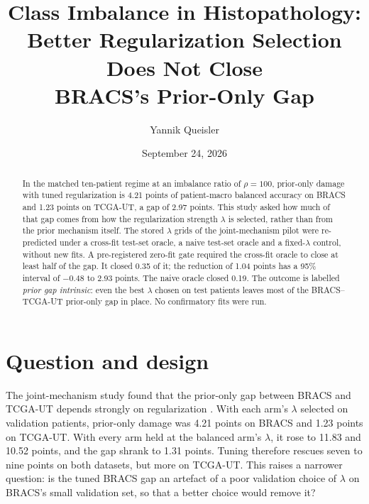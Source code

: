 \documentclass[11pt]{article}
\title{Class Imbalance in Histopathology:\\Better Regularization Selection Does Not Close\\{BRACS}'s Prior-Only Gap}
\author{Yannik Queisler}
\date{September 24, 2026}
\begin{document}
\raggedbottom
{}
\setlength{\emergencystretch}{2em}
\maketitle
\begin{abstract}
\noindent In the matched ten-patient regime at an imbalance ratio of $\rho=100$, prior-only damage with tuned regularization is 4.21 points of patient-macro balanced accuracy on BRACS and 1.23 points on TCGA-UT, a gap of 2.97 points. This study asked how much of that gap comes from how the regularization strength $\lambda$ is selected, rather than from the prior mechanism itself. The stored $\lambda$ grids of the joint-mechanism pilot were re-predicted under a cross-fit test-set oracle, a naive test-set oracle and a fixed-$\lambda$ control, without new fits. A pre-registered zero-fit gate required the cross-fit oracle to close at least half of the gap. It closed 0.35 of it; the reduction of 1.04 points has a 95\% interval of $-0.48$ to 2.93 points. The naive oracle closed 0.19. The outcome is labelled \emph{prior gap intrinsic}: even the best $\lambda$ chosen on test patients leaves most of the BRACS--TCGA-UT prior-only gap in place. No confirmatory fits were run.
\end{abstract}

\section{Question and design}
\label{sec:design}
The joint-mechanism study found that the prior-only gap between BRACS and TCGA-UT depends strongly on regularization \citep{queisler2026jointMechanism}. With each arm's $\lambda$ selected on validation patients, prior-only damage was 4.21 points on BRACS and 1.23 points on TCGA-UT. With every arm held at the balanced arm's $\lambda$, it rose to 11.83 and 10.52 points, and the gap shrank to 1.31 points. Tuning therefore rescues seven to nine points on both datasets, but more on TCGA-UT. This raises a narrower question: is the tuned BRACS gap an artefact of a poor validation choice of $\lambda$ on BRACS's small validation set, so that a better choice would remove it?
\end{document}
